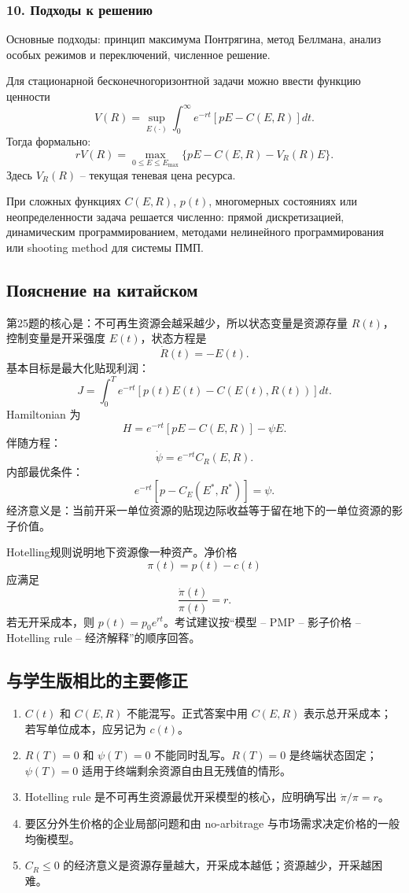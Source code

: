 \documentclass[12pt,a4paper]{article}
\begin{document}
\subsubsection*{10. Подходы к решению}
Основные подходы: принцип максимума Понтрягина, метод Беллмана, анализ особых режимов и переключений, численное решение.

Для стационарной бесконечногоризонтной задачи можно ввести функцию ценности
\[
V(R)=\sup_{E(\cdot)}\int_0^\infty e^{-rt}\left[pE-C(E,R)\right]dt.
\]
Тогда формально:
\[
rV(R)=\max_{0\le E\le E_{\max}}\{pE-C(E,R)-V_R(R)E\}.
\]
Здесь $V_R(R)$ -- текущая теневая цена ресурса.

При сложных функциях $C(E,R)$, $p(t)$, многомерных состояниях или неопределенности задача решается численно: прямой дискретизацией, динамическим программированием, методами нелинейного программирования или shooting method для системы ПМП.

\subsection{Пояснение на китайском}
第25题的核心是：不可再生资源会越采越少，所以状态变量是资源存量 $R(t)$，控制变量是开采强度 $E(t)$，状态方程是
\[
\dot R(t)=-E(t).
\]
基本目标是最大化贴现利润：
\[
J=\int_0^T e^{-rt}[p(t)E(t)-C(E(t),R(t))]dt.
\]
Hamiltonian 为
\[
H=e^{-rt}[pE-C(E,R)]-\psi E.
\]
伴随方程：
\[
\dot\psi=e^{-rt}C_R(E,R).
\]
内部最优条件：
\[
e^{-rt}[p-C_E(E^*,R^*)]=\psi.
\]
经济意义是：当前开采一单位资源的贴现边际收益等于留在地下的一单位资源的影子价值。

Hotelling规则说明地下资源像一种资产。净价格
\[
\pi(t)=p(t)-c(t)
\]
应满足
\[
\frac{\dot\pi(t)}{\pi(t)}=r.
\]
若无开采成本，则 $p(t)=p_0e^{rt}$。考试建议按“模型 -- PMP -- 影子价格 -- Hotelling rule -- 经济解释”的顺序回答。

\subsection{与学生版相比的主要修正}
\begin{enumerate}
\item $C(t)$ 和 $C(E,R)$ 不能混写。正式答案中用 $C(E,R)$ 表示总开采成本；若写单位成本，应另记为 $c(t)$。
\item $R(T)=0$ 和 $\psi(T)=0$ 不能同时乱写。$R(T)=0$ 是终端状态固定；$\psi(T)=0$ 适用于终端剩余资源自由且无残值的情形。
\item Hotelling rule 是不可再生资源最优开采模型的核心，应明确写出 $\dot\pi/\pi=r$。
\item 要区分外生价格的企业局部问题和由 no-arbitrage 与市场需求决定价格的一般均衡模型。
\item $C_R\le 0$ 的经济意义是资源存量越大，开采成本越低；资源越少，开采越困难。
\end{enumerate}
\end{document}
